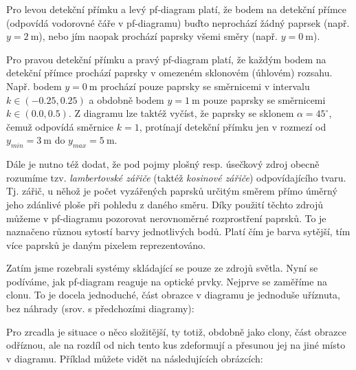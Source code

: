 
Pro levou detekční přímku a levý pf-diagram platí, že bodem na detekční přímce (odpovídá vodorovné čáře v pf-diagramu) buďto neprochází žádný paprsek (např. $y = 2\ \mathrm{m}$), nebo jím naopak prochází paprsky všemi směry (např. $y = 0\ \mathrm{m}$).

Pro pravou detekční přímku a pravý pf-diagram platí, že každým bodem na detekční přímce prochází paprsky v omezeném sklonovém (úhlovém) rozsahu. Např. bodem $y = 0\ \mathrm{m}$ prochází pouze paprsky se směrnicemi v intervalu $k \in (-0.25, 0.25)$ a obdobně bodem $y = 1\ \mathrm{m}$ pouze paprsky se směrnicemi $k \in (0.0, 0.5)$. Z diagramu lze taktéž vyčíst, že paprsky se sklonem $\alpha = 45^{\circ}$, čemuž odpovídá směrnice $k = 1$, protínají detekční přímku jen v rozmezí od $y_{min} = 3\ \mathrm{m}$ do $y_{max} = 5\ \mathrm{m}$.

Dále je nutno též dodat, že pod pojmy plošný resp. úsečkový zdroj obecně rozumíme tzv. \emph{lambertovské zářiče} (taktéž \emph{kosinové zářiče}) odpovídajícího tvaru. \parencite{fotometrie} Tj. zářič, u něhož je počet vyzářených paprsků určitým směrem přímo úměrný jeho zdánlivé ploše při pohledu z daného směru. Díky použití těchto zdrojů můžeme v pf-diagramu pozorovat nerovnoměrné rozprostření paprsků. To je naznačeno různou sytostí barvy jednotlivých bodů. Platí čím je barva sytější, tím více paprsků je daným pixelem reprezentováno.

Zatím jsme rozebrali systémy skládající se pouze ze zdrojů světla. Nyní se podíváme, jak pf-diagram reaguje na optické prvky. Nejprve se zaměříme na clonu. To je docela jednoduché, část obrazce v diagramu je jednoduše uříznuta, bez náhrady (srov. s předchozími diagramy):


Pro zrcadla je situace o něco složitější, ty totiž, obdobně jako clony, část obrazce odříznou, ale na rozdíl od nich tento kus zdeformují a přesunou jej na jiné místo v diagramu. Příklad můžete vidět na následujících obrázcích:

